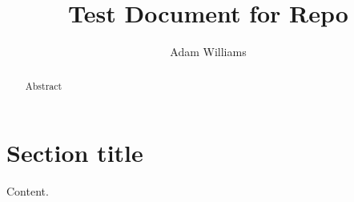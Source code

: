 \documentclass[]{article}
\title{Test Document for Repo}
\author{Adam Williams}
\begin{document}
\maketitle

\begin{abstract}
    Abstract
\end{abstract}

\section{Section title}

Content.
\end{document}
